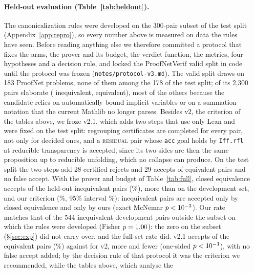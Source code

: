 \documentclass[10pt]{article}
\theoremstyle{definition}
\newcommand{\V}[1]{\textsc{#1}}
\begin{document}
\paragraph{Held-out evaluation (Table~\ref{tab:heldout}).} The canonicalization rules were developed
on the 300-pair subset of the test split (Appendix~\ref{app:repro}), so every number above is
measured on data the rules have seen. Before reading anything else we therefore committed a
protocol that fixes the arms, the prover and its budget, the verdict function, the metrics, four
hypotheses and a decision rule, and locked the ProofNetVerif valid split in code until the
protocol was frozen (\texttt{notes/protocol-v3.md}). The valid split draws on 183 ProofNet problems,
none of them among the 178 of the test split; \HeldValidPairs{} of its 2,300 pairs elaborate
(\HeldValidU{} inequivalent, \HeldValidF{} equivalent), most of the others because the candidate
relies on automatically bound implicit variables or on a summation notation that the current
Mathlib no longer parses. Besides v2, the criterion of the tables above, we froze v2.1, which adds
two steps that use only Lean and were fixed on the test split: regrouping certificates are
completed for every pair, not only for decided ones, and a \V{residual} pair whose \texttt{acc}
goal holds by \texttt{Iff.rfl} at reducible transparency is accepted, since its two sides are then
the same proposition up to reducible unfolding, which no collapse can produce. On the test split
the two steps add 28 certified rejects and 29 accepts of equivalent pairs and no false accept.
With the prover and budget of Table~\ref{tab:full}, closed equivalence accepts
\HeldValidClosedFA{} of the \HeldValidU{} held-out inequivalent pairs (\HeldValidClosedFAPct\%),
more than on the development set, and our criterion \HeldValidVtwoFA{} (\HeldValidVtwoFAPct\%,
95\% interval \HeldValidVtwoFACI\%): \HeldValidHoneB{} inequivalent pairs are accepted only by
closed equivalence and \HeldValidHoneC{} only by ours (exact McNemar $p<10^{-3}$). Our rate
matches that of the 544 inequivalent development pairs outside the subset on which the rules were
developed (Fisher $p=1.00$): the zero on the subset (\S\ref{sec:exp}) did not carry over,
and the full-set rate did. v2.1 accepts \HeldValidVtwoOneAcc{} of the \HeldValidF{} equivalent pairs
(\HeldValidVtwoOneAccPct\%) against \HeldValidVtwoAcc{} for v2, \HeldValidHtwoB{} more and
\HeldValidHtwoC{} fewer (one-sided $p<10^{-3}$), with no false accept added; by the decision
rule of that protocol it was the criterion we recommended, while the tables above, which analyse the
\end{document}
